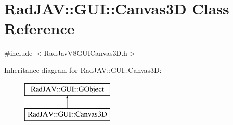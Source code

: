 \hypertarget{class_rad_j_a_v_1_1_g_u_i_1_1_canvas3_d}{}\section{Rad\+J\+AV\+:\+:G\+UI\+:\+:Canvas3D Class Reference}
\label{class_rad_j_a_v_1_1_g_u_i_1_1_canvas3_d}


{\ttfamily \#include $<$Rad\+Jav\+V8\+G\+U\+I\+Canvas3\+D.\+h$>$}

Inheritance diagram for Rad\+J\+AV\+:\+:G\+UI\+:\+:Canvas3D\+:\begin{figure}[H]
\begin{center}
\leavevmode
\includegraphics[height=2.000000cm]{class_rad_j_a_v_1_1_g_u_i_1_1_canvas3_d}
\end{center}
\end{figure}
